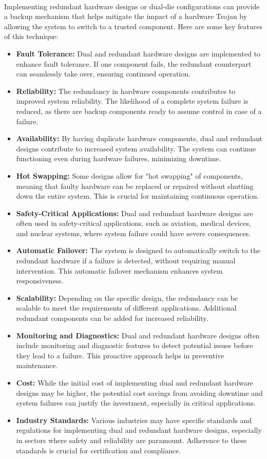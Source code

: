 \paragraph*{}
Implementing redundant hardware designs or dual-die configurations can provide a backup mechanism that helps mitigate the impact of a hardware Trojan by allowing the system to switch to a trusted component. Here are some key features of this technique:
\begin{itemize}
	\item \textbf{Fault Tolerance:} Dual and redundant hardware designs are implemented to enhance fault tolerance. If one component fails, the redundant counterpart can seamlessly take over, ensuring continued operation.
	\item \textbf{Reliability:} The redundancy in hardware components contributes to improved system reliability. The likelihood of a complete system failure is reduced, as there are backup components ready to assume control in case of a failure.
	\item \textbf{Availability:} By having duplicate hardware components, dual and redundant designs contribute to increased system availability. The system can continue functioning even during hardware failures, minimizing downtime.
	\item \textbf{Hot Swapping:} Some designs allow for "hot swapping" of components, meaning that faulty hardware can be replaced or repaired without shutting down the entire system. This is crucial for maintaining continuous operation.
	\item \textbf{Safety-Critical Applications:} Dual and redundant hardware designs are often used in safety-critical applications, such as aviation, medical devices, and nuclear systems, where system failure could have severe consequences.
	\item \textbf{Automatic Failover:} The system is designed to automatically switch to the redundant hardware if a failure is detected, without requiring manual intervention. This automatic failover mechanism enhances system responsiveness.
	\item\textbf{ Scalability:} Depending on the specific design, the redundancy can be scalable to meet the requirements of different applications. Additional redundant components can be added for increased reliability.
	\item \textbf{Monitoring and Diagnostics:} Dual and redundant hardware designs often include monitoring and diagnostic features to detect potential issues before they lead to a failure. This proactive approach helps in preventive maintenance.
	\item \textbf{Cost:} While the initial cost of implementing dual and redundant hardware designs may be higher, the potential cost savings from avoiding downtime and system failures can justify the investment, especially in critical applications.
	\item \textbf{Industry Standards:} Various industries may have specific standards and regulations for implementing dual and redundant hardware designs, especially in sectors where safety and reliability are paramount. Adherence to these standards is crucial for certification and compliance.
\end{itemize}
